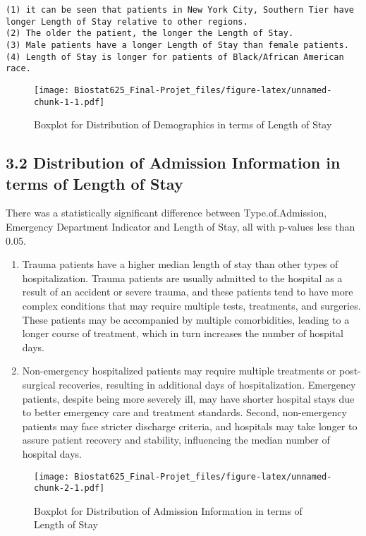 \documentclass[
  10pt,
]{article}
\begin{document}
\begin{verbatim}
(1) it can be seen that patients in New York City, Southern Tier have longer Length of Stay relative to other regions.
(2) The older the patient, the longer the Length of Stay.
(3) Male patients have a longer Length of Stay than female patients.
(4) Length of Stay is longer for patients of Black/African American race.
\end{verbatim}

\begin{figure}
\centering
\texttt{[image: Biostat625\_Final-Projet\_files/figure-latex/unnamed-chunk-1-1.pdf]}
\caption{Boxplot for Distribution of Demographics in terms of Length of
Stay}
\end{figure}

\subsection{3.2 Distribution of Admission Information in terms of Length
of
Stay}\label{distribution-of-admission-information-in-terms-of-length-of-stay}

There was a statistically significant difference between
Type.of.Admission, Emergency Department Indicator and Length of Stay,
all with p-values less than 0.05.

\begin{enumerate}
\def\labelenumi{(\arabic{enumi})}
\item
  Trauma patients have a higher median length of stay than other types
  of hospitalization. Trauma patients are usually admitted to the
  hospital as a result of an accident or severe trauma, and these
  patients tend to have more complex conditions that may require
  multiple tests, treatments, and surgeries. These patients may be
  accompanied by multiple comorbidities, leading to a longer course of
  treatment, which in turn increases the number of hospital days.
\item
  Non-emergency hospitalized patients may require multiple treatments or
  post-surgical recoveries, resulting in additional days of
  hospitalization. Emergency patients, despite being more severely ill,
  may have shorter hospital stays due to better emergency care and
  treatment standards. Second, non-emergency patients may face stricter
  discharge criteria, and hospitals may take longer to assure patient
  recovery and stability, influencing the median number of hospital
  days.
\end{enumerate}

\begin{figure}
\centering
\texttt{[image: Biostat625\_Final-Projet\_files/figure-latex/unnamed-chunk-2-1.pdf]}
\caption{Boxplot for Distribution of Admission Information in terms of
Length of Stay}
\end{figure}
\end{document}
